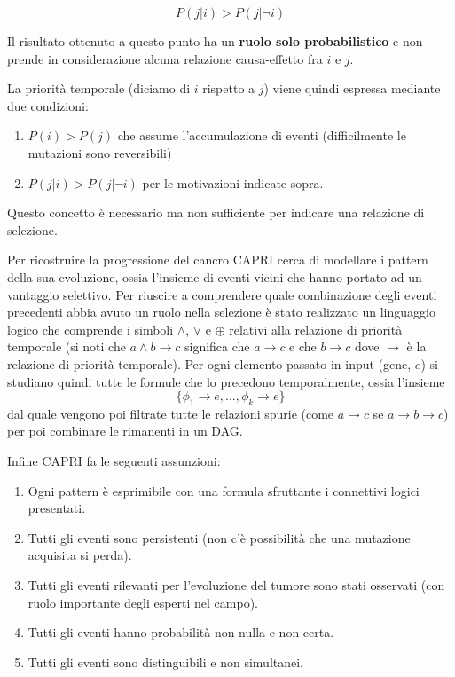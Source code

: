 \documentclass[a4paper]{article}
\begin{document}
	$$P(j|i)>P(j|\lnot i)$$ 

	Il risultato ottenuto a questo punto ha un \textbf{ruolo solo probabilistico} e non prende in considerazione alcuna relazione causa-effetto fra $i$ e $j$.

	La priorità temporale (diciamo di $i$ rispetto a $j$) viene quindi espressa mediante due condizioni:

	\begin{enumerate}
	\item $P(i)>P(j)$ che assume l'accumulazione di eventi (difficilmente le mutazioni sono reversibili)
	\item $P(j|i)>P(j|\lnot i)$ per le motivazioni indicate sopra.
	\end{enumerate}

	Questo concetto è necessario ma non sufficiente per indicare una relazione di selezione.

	Per ricostruire la progressione del cancro CAPRI cerca di modellare i pattern della sua evoluzione, ossia l'insieme
	di eventi vicini che hanno portato ad un vantaggio selettivo. Per riuscire a comprendere quale 
	combinazione degli eventi precedenti abbia avuto un ruolo nella selezione è stato realizzato un linguaggio logico
	che comprende i simboli $\land$, $\lor$ e $\oplus$ relativi alla relazione di priorità temporale
	(si noti che $a\land b \rightarrow c$ significa che $a \rightarrow c$ e che $b \rightarrow c$ dove $\rightarrow$ è la relazione di priorità temporale).
	Per ogni elemento passato in input (gene, $e$) si studiano quindi tutte le formule che lo precedono temporalmente, ossia l'insieme
	$$\{\phi_1 \rightarrow e, ... , \phi_k \rightarrow e\}$$ 
	dal quale vengono poi filtrate tutte le relazioni spurie (come $a \rightarrow c$ se $a \rightarrow b \rightarrow c$) per poi combinare le
	rimanenti in un DAG. 

	Infine CAPRI fa le seguenti assunzioni:
	
	\begin{enumerate}
	\item Ogni pattern è esprimibile con una formula sfruttante i connettivi logici presentati.
	\item Tutti gli eventi sono persistenti (non c'è possibilità che una mutazione acquisita si perda).
	\item Tutti gli eventi rilevanti per l'evoluzione del tumore sono stati osservati (con ruolo importante degli esperti nel campo). 
	\item Tutti gli eventi hanno probabilità non nulla e non certa.
	\item Tutti gli eventi sono distinguibili e non simultanei.
	\end{enumerate}
\end{document}
